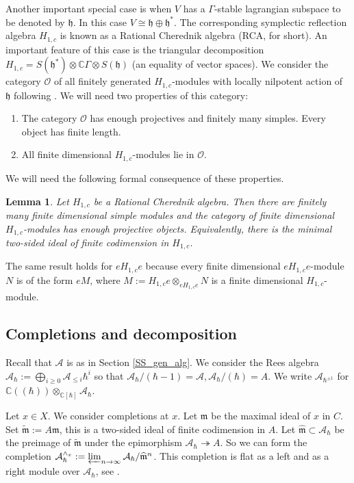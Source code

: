 \documentclass[12pt]{amsart}
\newcommand{\A}{\mathcal{A}}
\newcommand{\K}{\mathbb{C}}
\newcommand{\I}{\mathcal{I}}
\newcommand{\m}{\mathfrak{m}}
\newcommand{\h}{\mathfrak{h}}
\newcommand{\C}{\mathbb{C}}
\newtheorem{Lem}[Thm]{Lemma}
\theoremstyle{definition}
\begin{document}
Another important special case is when $V$ has a $\Gamma$-stable lagrangian subspace to
be denoted by $\h$. In this case $V\cong \h\oplus \h^*$. The corresponding symplectic
reflection algebra $H_{1,c}$ is known as a Rational Cherednik algebra (RCA, for short).
An important feature of this case is the triangular decomposition
$H_{1,c}=S(\h^*)\otimes \C\Gamma\otimes S(\h)$ (an equality of vector spaces).
We consider the category $\mathcal{O}$ of all finitely generated $H_{1,c}$-modules
with locally nilpotent action of $\h$ following \cite{GGOR}. We will need
two properties of this category:
\begin{enumerate}
\item The category $\mathcal{O}$ has enough projectives and finitely many simples. Every object has finite length.
\item All finite dimensional $H_{1,c}$-modules lie in $\mathcal{O}$.
\end{enumerate}
We will need the following formal consequence of these properties.

\begin{Lem}\label{Lem:RCA_fin}
Let $H_{1,c}$ be a Rational Cherednik algebra. Then there are finitely many finite dimensional
 simple modules and the category of finite dimensional $H_{1,c}$-modules
has enough projective objects. Equivalently, there is the minimal two-sided ideal of finite codimension
in $H_{1,c}$.
\end{Lem}

The same result holds for $eH_{1,c}e$ because every finite dimensional $eH_{1,c}e$-module $N$ is of
the form $eM$, where $M:=H_{1,c}e\otimes_{eH_{1,c}e}N$ is a finite dimensional $H_{1,c}$-module.

\subsection{Completions and decomposition}
Recall that $\A$ is as in Section \ref{SS_gen_alg}. We consider the Rees algebra
$\A_\hbar:=\bigoplus_{i\geqslant 0} \A_{\leqslant i}\hbar^i$ so that
$\A_\hbar/(\hbar-1)=\A, \A_\hbar/(\hbar)=A$.
We write $\A_{\hbar^{\pm 1}}$ for $\K((\hbar))\otimes_{\K[\hbar]}\A_\hbar$.

Let $x\in X$. We consider completions at $x$. Let $\m$ be the maximal ideal of $x$ in $C$.
Set $\tilde{\m}:=A\m$, this is a two-sided ideal of finite codimension in $A$.  Let
$\widehat{\m}\subset\A_\hbar$ be  the preimage of $\tilde{\m}$ under the epimorphism
$\A_\hbar\twoheadrightarrow A$. So we can form the completion
$\A_\hbar^{\wedge_x}:=\varprojlim_{n\rightarrow \infty} \A_\hbar/\widehat{\m}^n$.  This
completion is flat as a left and as a right module over $\A_\hbar$, see \cite[Lemma A.2]{Losev_App}.
\end{document}
